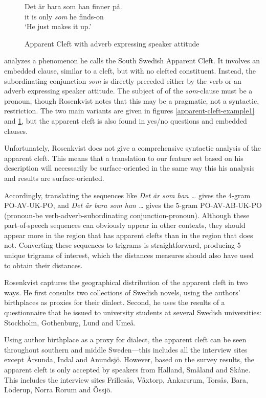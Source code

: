 \begin{figure}
 \gll Det \"ar bara som han finner p\aa{}. \\
  it is only {\it som} he finds-on \\
  \trans `He just makes it up.'
  \caption{Apparent Cleft with adverb expressing speaker attitude}
  \label{apparent-cleft-example2}
\end{figure}


 analyzes a phenomenon he calls the South
Swedish Apparent Cleft. It involves an embedded clause, similar to a
cleft, but with no clefted constituent. Instead, the subordinating
conjunction {\it som} is directly preceded either by the verb or an
adverb expressing speaker attitude. The subject of of the {\it
  som}-clause must be a pronoun, though Rosenkvist notes that this may
be a pragmatic, not a syntactic, restriction. The two main variants
are given in figures \ref{apparent-cleft-example1} and
\ref{apparent-cleft-example2}, but the apparent cleft is also found in
yes/no questions and embedded clauses.

Unfortunately, Rosenkvist does not give a comprehensive syntactic
analysis of the apparent cleft. This means that a translation to our
feature set based on his description will necessarily be
surface-oriented in the same way this his analysis and results are
surface-oriented.

Accordingly, translating the sequences like {\it Det \"ar som han
  \ldots} gives the 4-gram PO-AV-UK-PO, and {\it Det \"ar bara som han
  \ldots} gives the 5-gram PO-AV-AB-UK-PO (pronoun-be
verb-adverb-subordinating conjunction-pronoun). Although these
part-of-speech sequences can obviously appear in other contexts, they
should appear more in the region that has apparent clefts than in the
region that does not. Converting these sequences to trigrams is
straightforward, producing 5 unique trigrams of interest, which the
distances measures should also have used to obtain their distances.

Rosenkvist captures the geographical distribution of the apparent
cleft in two ways. He first consults two collections of Swedish
novels, using the authors' birthplaces as proxies for their
dialect. Second, he uses the results of a questionnaire that he issued
to university students at several Swedish universities: Stockholm,
Gothenburg, Lund and Ume\aa{}.

Using author birthplace as a proxy for dialect, the apparent cleft can
be seen throughout southern and middle Sweden---this includes all the
interview sites except \AA{}rsunda, Indal and Anundsj\"o. However, based
on the survey results, the apparent cleft is only accepted by speakers
from Halland, Sm\aa{}land and Sk\aa{}ne. This includes the interview sites
Frilles\aa{}s, V\aa{}xtorp, Ankarsrum, Tors\aa{}s, Bara, L\"oderup, Norra
Rorum and \"Ossj\"o.

